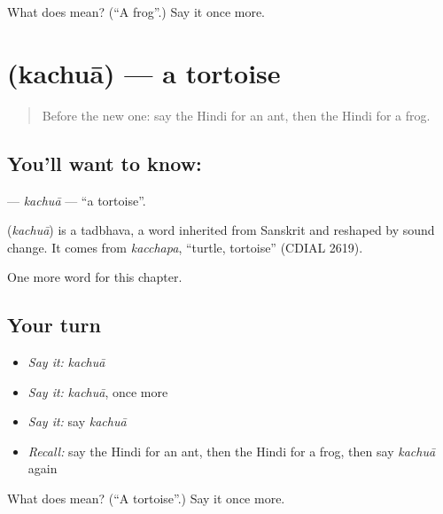 \begin{tcolorbox}[breakable,colback=teal!4,colframe=teal!35!black,title={Before you move on}]
What does  mean? (\textquotedblleft{}A frog\textquotedblright{}.) Say it once more.
\end{tcolorbox}
\section[\texorpdfstring{\hi{कछुआ} (kachuā)}{कछुआ (kachuā)}]{ (kachuā) — a tortoise}

\label{lesson:HI-C149-kachua}



\begin{quote}
Before the new one: say the Hindi for an ant, then the Hindi for a frog.
\end{quote}

\subsection*{You'll want to know: }
\textbf{} — \emph{kachuā} — \textquotedblleft{}a tortoise\textquotedblright{}.

\begin{cousinweb}
\textbf{} (\emph{kachuā}) is a tadbhava, a word inherited from Sanskrit and reshaped by sound change. It comes from \emph{kacchapa}, \textquotedblleft{}turtle, tortoise\textquotedblright{} (CDIAL 2619).
\end{cousinweb}

\begin{grammarlens}[title={What you've built}]
One more word for this chapter.
\end{grammarlens}

\subsection*{Your turn}
\begin{itemize}
\raggedright
  \item \emph{Say it:} \emph{kachuā}
  \item \emph{Say it:} \emph{kachuā}, once more
  \item \emph{Say it:} say \emph{kachuā}
  \item \emph{Recall:} say the Hindi for an ant, then the Hindi for a frog, then say \emph{kachuā} again
\end{itemize}

\begin{tcolorbox}[breakable,colback=teal!4,colframe=teal!35!black,title={Before you move on}]
What does  mean? (\textquotedblleft{}A tortoise\textquotedblright{}.) Say it once more.
\end{tcolorbox}
